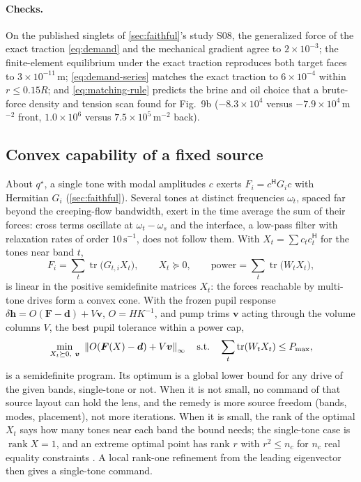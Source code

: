\paragraph{Checks.} On the published singlets of \cref{sec:faithful}'s study
S08, the generalized force of the exact traction \cref{eq:demand} and the
mechanical gradient agree to $2\times10^{-3}$; the finite-element equilibrium
under the exact traction reproduces both target faces to $3\times10^{-11}$\,m;
\cref{eq:demand-series} matches the exact traction to $6\times10^{-4}$ within
$r\le0.15R$; and \cref{eq:matching-rule} predicts the brine and oil choice that
a brute-force density and tension scan found for Fig.~9b
($-8.3\times10^4$ versus $-7.9\times10^4$\,m$^{-2}$ front, $1.0\times10^6$
versus $7.5\times10^5$\,m$^{-2}$ back).

\subsection{Convex capability of a fixed source}
About $q^\star$, a single tone with modal amplitudes $c$ exerts
$F_i=c^{\mathsf H}G_ic$ with Hermitian $G_i$ (\cref{sec:faithful}). Several tones
at distinct frequencies $\omega_t$, spaced far beyond the creeping-flow
bandwidth, exert in the time average the sum of their forces: cross terms
oscillate at $\omega_t-\omega_s$ and the interface, a low-pass filter with
relaxation rates of order $10\,\mathrm s^{-1}$, does not follow them. With
$X_t=\sum c_{t}c_{t}^{\mathsf H}$ for the tones near band $t$,
\begin{equation}
 F_i=\sum_t\operatorname{tr}\bigl(G_{t,i}X_t\bigr),\qquad X_t\succeq0,
 \qquad \text{power}=\sum_t\operatorname{tr}\bigl(W_tX_t\bigr),
 \label{eq:multitone}
\end{equation}
is linear in the positive semidefinite matrices $X_t$: the forces reachable by
multi-tone drives form a convex cone. With the frozen pupil response
$\delta\bm h=O(\bm F-\bm d)+V\bm v$, $O=HK^{-1}$, and pump trims $\bm v$ acting
through the volume columns $V$, the best pupil tolerance within a power cap,
\begin{equation}
 \min_{X_t\succeq0,\ \bm v}\ \left\lVert O(\bm F(X)-\bm d)+V\bm v\right\rVert_\infty
 \quad\text{s.t.}\quad \sum_t\operatorname{tr}(W_tX_t)\le P_{\max},
 \label{eq:capability}
\end{equation}
is a semidefinite program. Its optimum is a global lower bound for any drive of
the given bands, single-tone or not. When it is not small, no command of that
source layout can hold the lens, and the remedy is more source freedom (bands,
modes, placement), not more iterations. When it is small, the rank of the
optimal $X_t$ says how many tones near each band the bound needs; the
single-tone case is $\operatorname{rank}X=1$, and an extreme optimal point has
rank $r$ with $r^2\le n_c$ for $n_c$ real equality constraints
\cite{barvinok1995,pataki1998}. A local rank-one refinement from the leading
eigenvector then gives a single-tone command.

